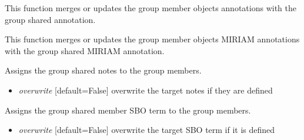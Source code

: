 \documentclass[a4paper,11pt,english]{sphinxmanual}
\begin{document}
\begin{fulllineitems}
\begin{fulllineitems}
\begin{itemize}
\end{itemize}

\end{fulllineitems}


\begin{fulllineitems}
\label{modules_doc:cbmpy.CBModel.Group.assignSharedAnnotationToMembers}
This function merges or updates the group member objects annotations with the group shared annotation.

\end{fulllineitems}


\begin{fulllineitems}
\label{modules_doc:cbmpy.CBModel.Group.assignSharedMIRIAMannotationToMembers}
This function merges or updates the group member objects MIRIAM annotations with the group shared MIRIAM annotation.

\end{fulllineitems}


\begin{fulllineitems}
\label{modules_doc:cbmpy.CBModel.Group.assignSharedNotesToMembers}
Assigns the group shared notes to the group members.
\begin{itemize}
\item {} 
\emph{overwrite} {[}default=False{]} overwrite the target notes if they are defined

\end{itemize}

\end{fulllineitems}


\begin{fulllineitems}
\label{modules_doc:cbmpy.CBModel.Group.assignSharedSBOtermsToMembers}
Assigns the group shared member SBO term to the group members.
\begin{itemize}
\item {} 
\emph{overwrite} {[}default=False{]} overwrite the target SBO term if it is defined


\end{itemize}
\end{fulllineitems}
\end{fulllineitems}
\end{document}
